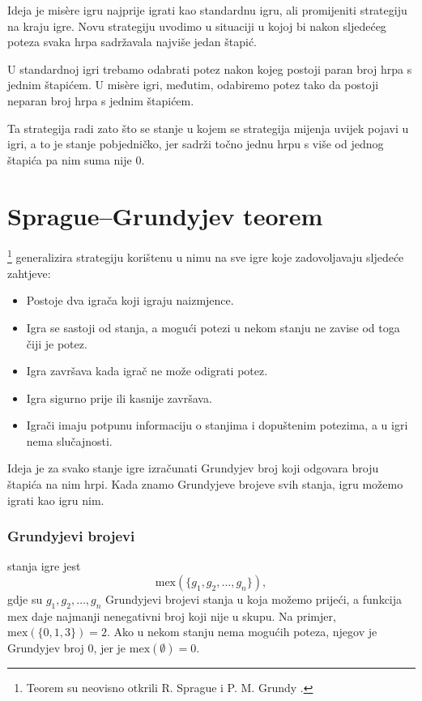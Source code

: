 Ideja je misère igru najprije igrati
kao standardnu igru, ali promijeniti strategiju
na kraju igre.
Novu strategiju uvodimo u situaciji
u kojoj bi nakon sljedećeg poteza svaka hrpa
sadržavala najviše jedan štapić.

U standardnoj igri trebamo odabrati potez
nakon kojeg postoji paran broj hrpa s jednim štapićem.
U misère igri, međutim, odabiremo potez tako da
postoji neparan broj hrpa s jednim štapićem.

Ta strategija radi zato što se stanje u kojem se
strategija mijenja uvijek pojavi u igri,
a to je stanje pobjedničko, jer
sadrži točno jednu hrpu s više od jednog štapića
pa nim suma nije 0.

\section{Sprague–Grundyjev teorem}


\footnote{Teorem su
neovisno otkrili R. Sprague \cite{spr35} i P. M. Grundy \cite{gru39}.} generalizira
strategiju korištenu u nimu na sve igre koje zadovoljavaju
sljedeće zahtjeve:

\begin{itemize}[noitemsep]
\item Postoje dva igrača koji igraju naizmjence.
\item Igra se sastoji od stanja, a mogući potezi
u nekom stanju ne zavise od toga čiji je potez.
\item Igra završava kada igrač ne može odigrati potez.
\item Igra sigurno prije ili kasnije završava.
\item Igrači imaju potpunu informaciju o
stanjima i dopuštenim potezima, a u igri nema slučajnosti.
\end{itemize}
Ideja je za svako stanje igre izračunati
Grundyjev broj koji odgovara broju
štapića na nim hrpi.
Kada znamo Grundyjeve brojeve svih stanja,
igru možemo igrati kao igru nim.

\subsubsection{Grundyjevi brojevi}


 stanja igre jest
\[\textrm{mex}(\{g_1,g_2,\ldots,g_n\}),\]
gdje su $g_1,g_2,\ldots,g_n$ Grundyjevi brojevi
stanja u koja možemo prijeći,
a funkcija mex daje najmanji
nenegativni broj koji nije u skupu.
Na primjer, $\textrm{mex}(\{0,1,3\})=2$.
Ako u nekom stanju nema mogućih poteza,
njegov je Grundyjev broj 0, jer je
$\textrm{mex}(\emptyset)=0$.

